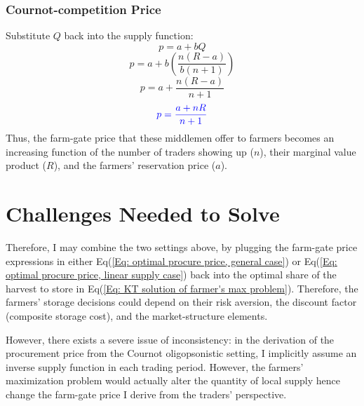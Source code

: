 \documentclass[12pt]{article}
\begin{document}
\subsubsection*{Cournot-competition Price}

Substitute \( Q \) back into the supply function:
\[
p = a + bQ
\]
\[
p = a + b \left( \frac{n(R - a)}{b(n+1)} \right)
\]
\[
p = a + \frac{n(R - a)}{n+1}
\]
\begin{equation}
    \textcolor{blue}{p = \frac{a + nR}{n+1}}
    \label{Eq: optimal procure price, linear supply case}
\end{equation}
Thus, the farm-gate price that these middlemen offer to farmers becomes an increasing function of the number of traders showing up ($n$), their marginal value product ($R$), and the farmers' reservation price ($a$).


\section{Challenges Needed to Solve}
Therefore, I may combine the two settings above, by plugging the farm-gate price expressions in either Eq(\ref{Eq: optimal procure price, general case}) or Eq(\ref{Eq: optimal procure price, linear supply case}) back into the optimal share of the harvest to store in Eq(\ref{Eq: KT solution of farmer's max problem}). Therefore, the farmers' storage decisions could depend on their risk aversion, the discount factor (composite storage cost), and the market-structure elements. 


However, there exists a severe issue of inconsistency: in the derivation of the procurement price from the Cournot oligopsonistic setting, I implicitly assume an inverse supply function in each trading period. However, the farmers' maximization problem would actually alter the quantity of local supply hence change the farm-gate price I derive from the traders' perspective. 
\end{document}
